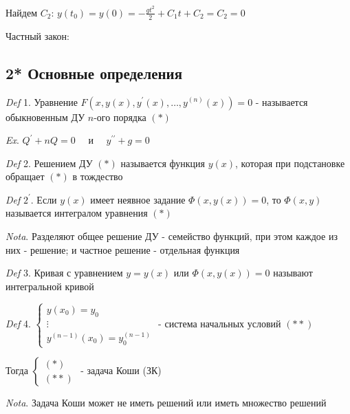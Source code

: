 \documentclass[12pt]{article}
\begin{document}
    Найдем $\displaystyle C_2$: $\displaystyle y(t_0) = y(0) = -\frac{gt^2}{2} + C_1 t + C_2 = C_2 = 0$

    Частный закон: 

    \vspace{5mm}

    \subsection{2* Основные определения}

    \vspace{3mm}
\textit{Def} 1. Уравнение $\displaystyle F(x, y(x), y^\prime(x), \dots, y^{(n)}(x)) = 0$ - называется обыкновенным ДУ $n$-ого порядка $(*)$

    \vspace{3mm}
\textit{Ex}. $\displaystyle Q^\prime + nQ = 0 \quad$ и $\displaystyle \quad y^{\prime\prime} + g = 0$

    \vspace{3mm}
\textit{Def} 2. Решением ДУ $(*)$ называется функция $y(x)$, которая при подстановке обращает $(*)$ в тождество

    \vspace{3mm}
\textit{Def} $\displaystyle 2^\prime$. Если $y(x)$ имеет неявное задание $\Phi(x, y(x)) = 0$, то $\Phi(x, y)$ называется интегралом уравнения $(*)$

    \vspace{3mm}
\textit{Nota}. Разделяют общее решение ДУ - семейство функций, при этом каждое из них - решение; и
    частное решение - отдельная функция

    \vspace{3mm}
\textit{Def} 3. Кривая с уравнением $y = y(x)$ или $\Phi(x, y(x)) = 0$ называют интегральной кривой

    \vspace{3mm}
\textit{Def} 4. $\displaystyle \begin{cases}y(x_0) = y_0 \\ \vdots \\ y^{(n - 1)}(x_0) = y_0^{(n - 1)}\end{cases}$ - система начальных условий $(**)$

    Тогда $\begin{cases}(*) \\ (**)\end{cases}$ - задача Коши (ЗК)

    \vspace{3mm}
\textit{Nota}. Задача Коши может не иметь решений или иметь множество решений
\end{document}
